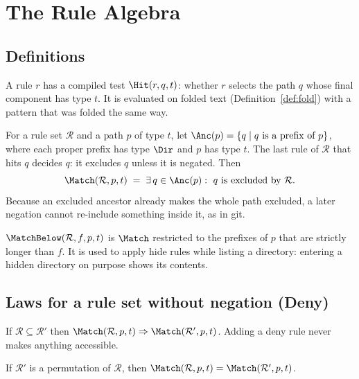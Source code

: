 \section{The Rule Algebra}
\label{sec:rules}

\subsection{Definitions}

A rule $r$ has a compiled test $\Hit(r,q,t)$: whether $r$ selects the path $q$
whose final component has type $t$.  It is evaluated on folded text
(Definition~\ref{def:fold}) with a pattern that was folded the same way.

\begin{definition}[Exclusion]
\label{def:excl}
For a rule set $\mathcal R$ and a path $p$ of type $t$, let
$\Anc(p)=\{q\mid q\text{ is a prefix of }p\}$, where each proper prefix has type
$\Dir$ and $p$ has type $t$.  The last rule of $\mathcal R$ that hits $q$ decides
$q$: it excludes $q$ unless it is negated.  Then
\[
  \Match(\mathcal R,p,t)\;=\;\exists\, q\in\Anc(p):\ q\text{ is excluded by }\mathcal R.
\]
Because an excluded ancestor already makes the whole path excluded, a later
negation cannot re-include something inside it, as in git.
\end{definition}

\begin{definition}
\label{def:matchbelow}
$\MatchBelow(\mathcal R,f,p,t)$ is $\Match$ restricted to the prefixes of $p$
that are strictly longer than $f$.  It is used to apply hide rules while listing
a directory: entering a hidden directory on purpose shows its contents.
\end{definition}

\subsection{Laws for a rule set without negation (Deny)}

\begin{law}
\label{law:deny-monotone}
If $\mathcal R\subseteq\mathcal R'$ then
$\Match(\mathcal R,p,t)\Rightarrow\Match(\mathcal R',p,t)$.  Adding a deny rule
never makes anything accessible.
\end{law}

\begin{law}
\label{law:deny-order}
If $\mathcal R'$ is a permutation of $\mathcal R$, then
$\Match(\mathcal R,p,t)=\Match(\mathcal R',p,t)$.
\end{law}

